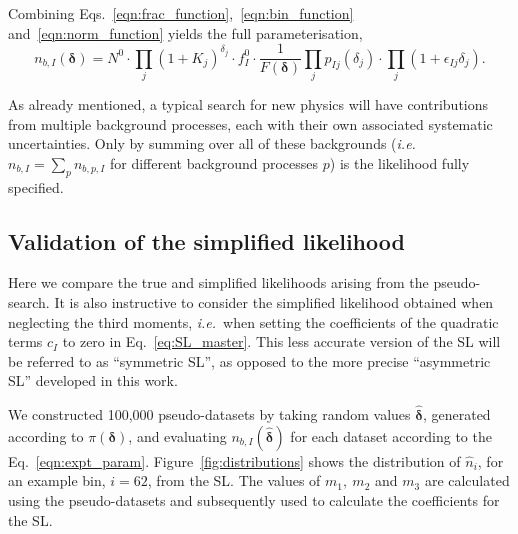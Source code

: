 \documentclass[11pt]{article}
\def\ie{{\it i.e.}}
\begin{document}
Combining Eqs.~\eqref{eqn:frac_function},~\eqref{eqn:bin_function} and~\eqref{eqn:norm_function} yields the full parameterisation,
%
\begin{equation}
 n_{b,I}(\bm{\delta}) = N^{0}\cdot \prod_{j}(1+K_{j})^{\delta_{j}} \cdot f^{0}_{I} \cdot\frac{1}{F(\bm{\delta})} \prod_{j} p_{Ij}(\delta_{j}) \cdot \prod_{j} (1+\epsilon_{Ij}\delta_{j}).
\label{eqn:expt_param}
\end{equation}

As already mentioned, a typical search for new physics will have contributions from multiple background processes, each with their own associated systematic uncertainties.
Only by summing over all of these backgrounds (\ie\ $n_{b,I}=\sum_{p}n_{b,p,I}$ for different background processes $p$) is the likelihood fully specified.









\subsection{Validation of the simplified likelihood}


Here we compare the true and simplified likelihoods arising from the pseudo-search. It is also instructive to consider the simplified likelihood obtained when neglecting the third moments, \ie\ when setting the coefficients of the quadratic terms $c_I$ to zero in Eq.~\eqref{eq:SL_master}. This less accurate version of the SL will be  referred to as ``symmetric SL'', as opposed to the more precise ``asymmetric SL'' developed in this work. 


We constructed 100,000 pseudo-datasets by taking random values ${\hat{\bm{\delta}}}$, generated according to $\pi(\bm{\delta})$, and evaluating
$n_{b,I}(\hat{\bm{\delta}})$ for each dataset according to the Eq.~\eqref{eqn:expt_param}. Figure~\ref{fig:distributions} shows the distribution of $\hat{n}_{i}$, for an example bin, $i=62$,
from the SL. The values of $m_{1},~m_{2}$ and $m_{3}$ are calculated using the pseudo-datasets and subsequently used to calculate the coefficients for the SL.
\end{document}
